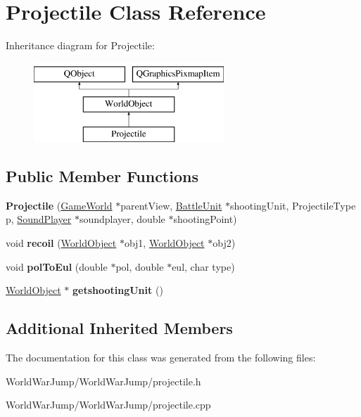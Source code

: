 \hypertarget{class_projectile}{}\section{Projectile Class Reference}
\label{class_projectile}
Inheritance diagram for Projectile\+:\begin{figure}[H]
\begin{center}
\leavevmode
\includegraphics[height=3.000000cm]{class_projectile}
\end{center}
\end{figure}
\subsection*{Public Member Functions}
\begin{DoxyCompactItemize}
\item 
{\bfseries Projectile} (\hyperlink{class_game_world}{Game\+World} $\ast$parent\+View, \hyperlink{class_battle_unit}{Battle\+Unit} $\ast$shooting\+Unit, Projectile\+Type p, \hyperlink{class_sound_player}{Sound\+Player} $\ast$soundplayer, double $\ast$shooting\+Point)\hypertarget{class_projectile_a78d923a25fe271ac68edc1f1de95e3e8}{}\label{class_projectile_a78d923a25fe271ac68edc1f1de95e3e8}

\item 
void {\bfseries recoil} (\hyperlink{class_world_object}{World\+Object} $\ast$obj1, \hyperlink{class_world_object}{World\+Object} $\ast$obj2)\hypertarget{class_projectile_a0c2d868fd9e05d3055b8f625399d7909}{}\label{class_projectile_a0c2d868fd9e05d3055b8f625399d7909}

\item 
void {\bfseries pol\+To\+Eul} (double $\ast$pol, double $\ast$eul, char type)\hypertarget{class_projectile_ae66148108698335706f51a19aaec764c}{}\label{class_projectile_ae66148108698335706f51a19aaec764c}

\item 
\hyperlink{class_world_object}{World\+Object} $\ast$ {\bfseries getshooting\+Unit} ()\hypertarget{class_projectile_aa8868e4a292212337b3d6de12e9da63a}{}\label{class_projectile_aa8868e4a292212337b3d6de12e9da63a}

\end{DoxyCompactItemize}
\subsection*{Additional Inherited Members}


The documentation for this class was generated from the following files\+:\begin{DoxyCompactItemize}
\item 
World\+War\+Jump/\+World\+War\+Jump/projectile.\+h\item 
World\+War\+Jump/\+World\+War\+Jump/projectile.\+cpp\end{DoxyCompactItemize}
